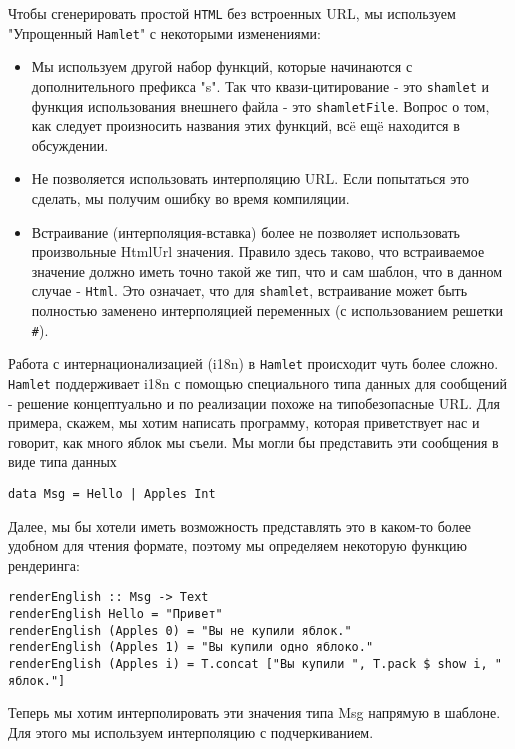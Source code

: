 Чтобы сгенерировать простой \texttt{HTML} без встроенных URL, мы используем 
"Упрощенный \texttt{Hamlet}" с некоторыми изменениями:

\begin{itemize}
\item Мы используем другой набор функций, которые начинаются с дополнительного 
префикса "s". Так что квази-цитирование - это \texttt{shamlet} и функция 
использования внешнего файла - это \texttt{shamletFile}. Вопрос о том, как следует произносить
названия этих функций, всë ещë находится в обсуждении.
\item Не позволяется использовать интерполяцию URL. Если попытаться это сделать, 
мы получим ошибку во время компиляции.
\item Встраивание (интерполяция-вставка) более не позволяет использовать произвольные
HtmlUrl значения. Правило здесь таково, что встраиваемое значение должно иметь
точно такой же тип, что и сам шаблон, что в данном случае - \lstinline!Html!. Это означает,
что для \texttt{shamlet}, встраивание может быть полностью заменено интерполяцией
переменных (с использованием решетки \texttt{\#}).
\end{itemize}

Работа с интернационализацией (i18n) в \texttt{Hamlet} происходит чуть более сложно.
\texttt{Hamlet} поддерживает i18n с помощью специального типа данных для сообщений - решение
концептуально и по реализации похоже на типобезопасные URL. Для примера, скажем, 
мы хотим написать программу, которая приветствует нас и говорит, как много яблок 
мы съели. Мы могли бы представить эти сообщения в виде типа данных

\begin{lstlisting}
data Msg = Hello | Apples Int
\end{lstlisting}

Далее, мы бы хотели иметь возможность представлять это в каком-то более удобном
для чтения формате, поэтому мы определяем некоторую функцию рендеринга:
\begin{lstlisting}
renderEnglish :: Msg -> Text
renderEnglish Hello = "Привет"
renderEnglish (Apples 0) = "Вы не купили яблок."
renderEnglish (Apples 1) = "Вы купили одно яблоко."
renderEnglish (Apples i) = T.concat ["Вы купили ", T.pack $ show i, " яблок."]
\end{lstlisting}

Теперь мы хотим интерполировать эти значения типа Msg напрямую в шаблоне.
Для этого мы используем интерполяцию с подчеркиванием.

